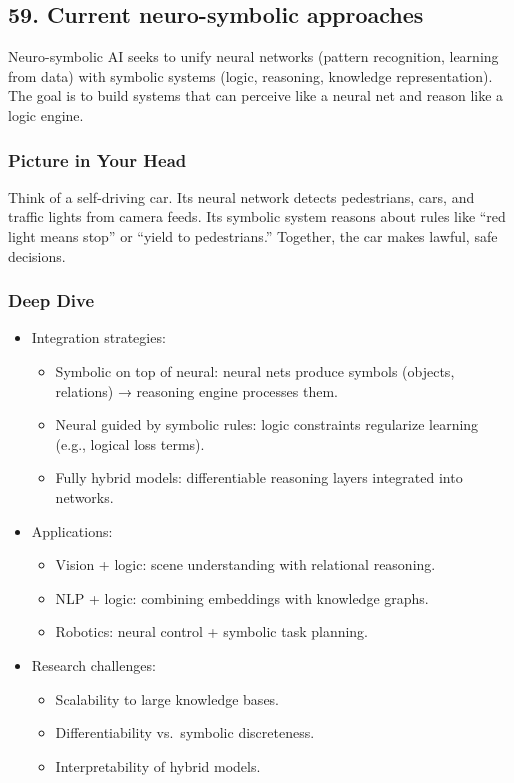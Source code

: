 \documentclass[
  letterpaper,
  DIV=11,
  numbers=noendperiod]{scrreprt}
\providecommand{\tightlist}{%
  \setlength{\itemsep}{0pt}\setlength{\parskip}{0pt}}
\begin{document}
\subsection{59. Current neuro-symbolic
approaches}\label{current-neuro-symbolic-approaches}

Neuro-symbolic AI seeks to unify neural networks (pattern recognition,
learning from data) with symbolic systems (logic, reasoning, knowledge
representation). The goal is to build systems that can perceive like a
neural net and reason like a logic engine.

\subsubsection{Picture in Your Head}\label{picture-in-your-head-58}

Think of a self-driving car. Its neural network detects pedestrians,
cars, and traffic lights from camera feeds. Its symbolic system reasons
about rules like ``red light means stop'' or ``yield to pedestrians.''
Together, the car makes lawful, safe decisions.

\subsubsection{Deep Dive}\label{deep-dive-58}

\begin{itemize}
\item
  Integration strategies:

  \begin{itemize}
  \tightlist
  \item
    Symbolic on top of neural: neural nets produce symbols (objects,
    relations) → reasoning engine processes them.
  \item
    Neural guided by symbolic rules: logic constraints regularize
    learning (e.g., logical loss terms).
  \item
    Fully hybrid models: differentiable reasoning layers integrated into
    networks.
  \end{itemize}
\item
  Applications:

  \begin{itemize}
  \tightlist
  \item
    Vision + logic: scene understanding with relational reasoning.
  \item
    NLP + logic: combining embeddings with knowledge graphs.
  \item
    Robotics: neural control + symbolic task planning.
  \end{itemize}
\item
  Research challenges:

  \begin{itemize}
  \tightlist
  \item
    Scalability to large knowledge bases.
  \item
    Differentiability vs.~symbolic discreteness.
  \item
    Interpretability of hybrid models.
  \end{itemize}
\end{itemize}
\end{document}
